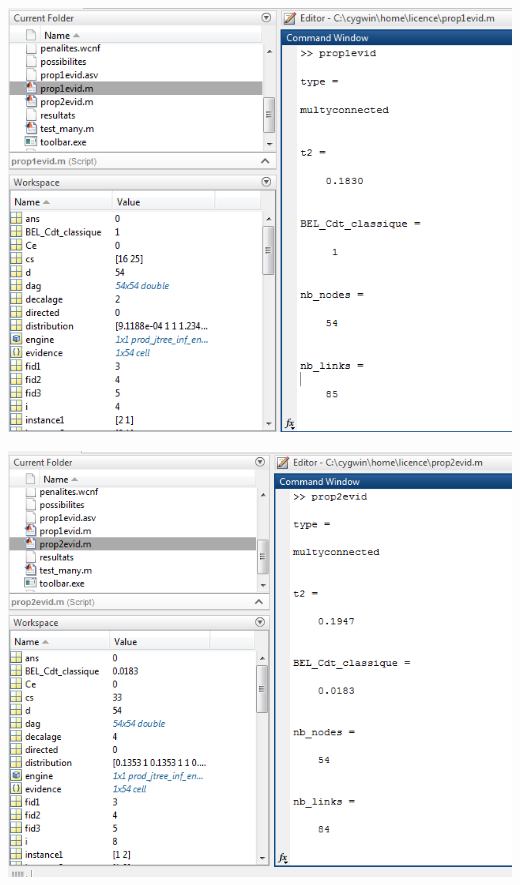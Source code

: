 \documentclass[12pt,a4paper,oneside]{book}
\begin{document}
	
	\begin{frame}{}
		\centering
		\begin{minipage}[H]{0.5\linewidth}
			\includegraphics[width=1\textwidth]{screens/prodevid1affichge.png}%
			\label{labelname}%
		\end{minipage}
		\hspace{0.5cm}
		\begin{minipage}[H]{0.5\linewidth}
			\includegraphics[width=1\textwidth]{screens/prodevid2affichage.png}%
			\label{labelname}%
		\end{minipage}
	\end{frame}
\end{document}
